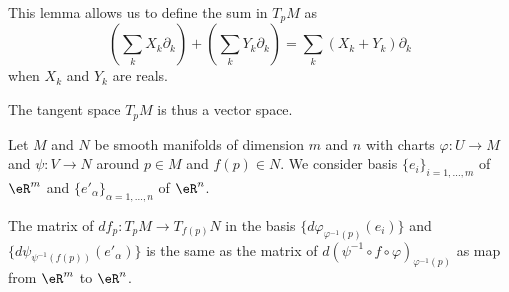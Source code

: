 This lemma allows us to define the sum in \( T_pM\) as      %
\begin{equation}
    \left( \sum_kX_k\partial_k \right)+\left( \sum_kY_k\partial_k \right)=\sum_k (X_k+Y_k)\partial_k
\end{equation}
when \( X_k\) and \( Y_k\) are reals.

The tangent space \( T_pM\) is thus a vector space.

\begin{lemma}       \label{LEMooVCSJooEuDZFz}
    Let \( M\) and \( N\) be smooth manifolds of dimension \( m\) and \( n\) with charts \( \varphi\colon U\to M\) and \( \psi\colon V\to N\) around \( p\in M\) and \( f(p)\in N\). We consider basis \( \{ e_i \}_{i=1,\ldots, m}\) of \( \eR^m\) and \( \{ e'_{\alpha} \}_{\alpha=1,\ldots, n}\) of \( \eR^n\).

    The matrix of \( df_p\colon T_pM\to T_{f(p)}N\) in the basis \( \{ d\varphi_{\varphi^{-1}(p)}(e_i) \}\) and \( \{ d\psi_{\psi^{-1}(f(p))}(e'_{\alpha}) \}\) is the same as the matrix of \( d(\psi^{-1}\circ f\circ\varphi)_{\varphi^{-1}(p)}\) as map from \( \eR^m\) to \( \eR^n\).
\end{lemma}

